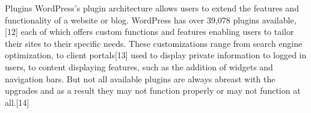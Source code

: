 Plugins
WordPress's plugin architecture allows users to extend the features and functionality of a website or blog. WordPress has over 39,078 plugins available,[12] each of which offers custom functions and features enabling users to tailor their sites to their specific needs. These customizations range from search engine optimization, to client portals[13] used to display private information to logged in users, to content displaying features, such as the addition of widgets and navigation bars. But not all available plugins are always abreast with the upgrades and as a result they may not function properly or may not function at all.[14]

